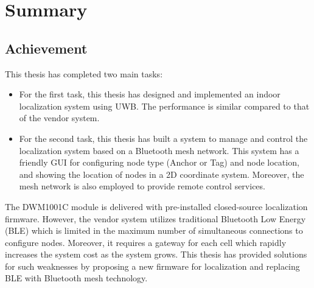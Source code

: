 \documentclass[\main/main.tex]{subfiles}
\begin{document}
\graphicspath{{img/}{summary/img/}}

\chapter{Summary}

\section{Achievement}
This thesis has completed two main tasks:
\begin{itemize}
    \item For the first task, this thesis has designed and implemented an indoor localization system using UWB. The performance is similar compared to that of the vendor system.
    \item For the second task, this thesis has built a system to manage and control the localization system based on a Bluetooth mesh network. This system has a friendly GUI for configuring node type (Anchor or Tag) and node location, and showing the location of nodes in a 2D coordinate system. Moreover, the mesh network is also employed to provide remote control services.
\end{itemize}
The DWM1001C module is delivered with pre-installed closed-source localization firmware. However, the vendor system utilizes traditional Bluetooth Low Energy (BLE) which is limited in the maximum number of simultaneous connections to configure nodes. Moreover, it requires a gateway for each cell which rapidly increases the system cost as the system grows. This thesis has provided solutions for such weaknesses by proposing a new firmware for localization and replacing BLE with Bluetooth mesh technology.
\end{document}
